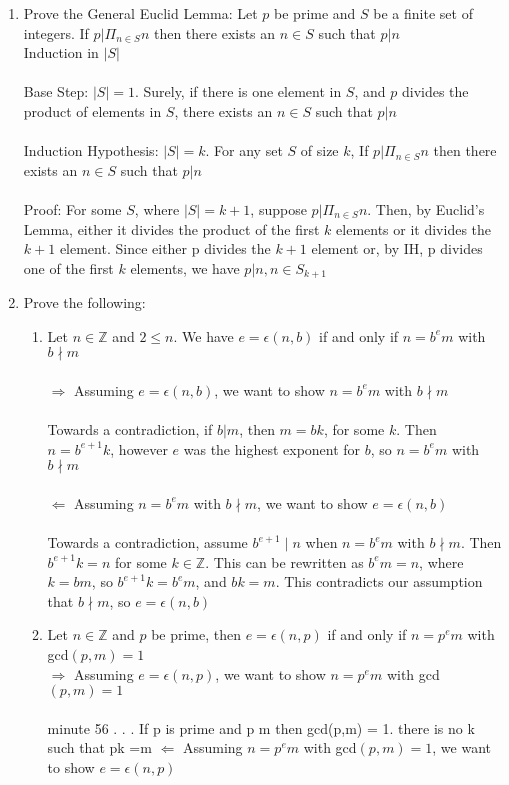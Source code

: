 \documentclass[11pt]{article}
\begin{document}
\begin{enumerate}
\newpage %
\item Prove the General Euclid Lemma: Let $p$ be prime and $S$ be a finite set of integers.  If $p|\Pi_{n \in S}n$ then there exists an $n \in S$ such that $p | n$
\\
Induction in $|S|$
\\\\
Base Step: $|S| = 1$.  Surely, if there is one element in $S$, and $p$ divides the product of elements in $S$, there exists an $n \in S$ such that $p | n$
\\
\\
Induction Hypothesis: $|S| = k$.  For any set $S$ of size $k$, If $p|\Pi_{n \in S}n$ then there exists an $n \in S$ such that $p | n$
\\
\\
Proof: For some $S$, where $|S| = k + 1$, suppose $p | \Pi_{n \in S}n$.  Then, by Euclid's Lemma, either it divides the product of the first $k$ elements or it divides the $k+1$ element.  Since either p divides the $k+1$ element or, by IH, p divides one of the first $k$ elements, we have $p |n, n \in S_{k+1}$

\newpage %
\item Prove the following:
\begin{enumerate}
\item Let $n \in \mathbb{Z}$ and $2 \leq n$.  We have $e = \epsilon(n,b)$ if and only if $n = b^em$ with $b \nmid m$\\
\\
$\Rightarrow$ Assuming $e = \epsilon(n,b)$, we want to show $n = b^em$ with $b \nmid m$\\
\\
Towards a contradiction, if $b|m$, then $m = bk$, for some $k$.  Then $n = b^{e+1}k$, however $e$ was the highest exponent for $b$, so $n = b^em$ with $b \nmid m$
\\
\\
$\Leftarrow$ Assuming $n = b^em$ with $b \nmid m$, we want to show $e = \epsilon(n,b)$\\
\\
Towards a contradiction, assume $b^{e+1} \mid n$ when $n = b^em$ with $b \nmid m$.  Then $b^{e+1}k = n$ for some $k \in \mathbb{Z}$.  This can be rewritten as $b^em = n$, where $k = bm$, so $b^{e+1}k = b^em$, and $bk=m$.  This contradicts our assumption that $b \nmid m$, so $e = \epsilon(n,b)$
\\

\item Let $n \in \mathbb{Z}$ and $p$ be prime, then $e = \epsilon(n,p)$ if and only if $n = p^em$ with gcd$(p,m) = 1$\\
$\Rightarrow$ Assuming $e = \epsilon(n,p)$, we want to show $n = p^em$ with gcd$(p,m) = 1$\\
\\
minute 56 . . . If p is prime and p \nmid m then gcd(p,m) = 1.  there is no k such that pk =m
$\Leftarrow$ Assuming $n = p^em$ with gcd$(p,m) = 1$, we want to show $e = \epsilon(n,p)$\\
\\
\\


\end{enumerate}
\end{enumerate}
\end{document}
